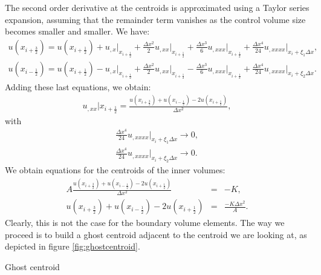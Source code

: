 \documentclass[a4paper,12pt]{article}
\makeatletter
\newenvironment{figurehere}
  {\def\@captype{figure}}
  {}
\makeatother
\begin{document}
The second order derivative at the centroids is approximated using a Taylor series expansion, assuming that the remainder term vanishes as the control volume size becomes smaller and smaller. We have:
\begin{eqnarray}
u(x_{i+\frac{3}{2}}) = u(x_{i + \frac{1}{2}}) + u_{,x}\vert_{x_{i+\frac{1}{2}}} + \frac{\Delta x^2}{2}u_{,xx}\vert_{x_{i+\frac{1}{2}}}+\frac{\Delta x^3}{6}u_{,xxx}\vert_{x_{i+\frac{1}{2}}}+\frac{\Delta x^4}{24}u_{,xxxx}\vert_{x_i+\xi_1\Delta x},\\
u(x_{i-\frac{1}{2}}) = u(x_{i + \frac{1}{2}}) - u_{,x}\vert_{x_{i+\frac{1}{2}}} + \frac{\Delta x^2}{2}u_{,xx}\vert_{x_{i+\frac{1}{2}}}-\frac{\Delta x^3}{6}u_{,xxx}\vert_{x_{i+\frac{1}{2}}}+\frac{\Delta x^4}{24}u_{,xxxx}\vert_{x_i+\xi_2\Delta x}.
\end{eqnarray}
Adding these last equations, we obtain:
\begin{eqnarray}
u_{,xx}\vert{x_{i+\frac{1}{2}}} = \frac{u(x_{i+\frac{3}{2}})+u(x_{i-\frac{1}{2}})-2u(x_{i+\frac{1}{2}})}{\Delta x^2},
\end{eqnarray}
with
\begin{eqnarray}
\frac{\Delta x^4}{24}u_{,xxxx}\vert_{x_i+\xi_1\Delta x}\rightarrow 0,\\
\frac{\Delta x^4}{24}u_{,xxxx}\vert_{x_i+\xi_2\Delta x}\rightarrow 0.
\end{eqnarray}
We obtain equations for the centroids of the inner volumes:
\begin{eqnarray}
A\frac{u(x_{i+\frac{3}{2}})+u(x_{i-\frac{1}{2}})-2u(x_{i+\frac{1}{2}})}{\Delta x^2}&=&-K,\\
u(x_{i+\frac{3}{2}})+u(x_{i-\frac{1}{2}})-2u(x_{i+\frac{1}{2}}) &=& \frac{-K\Delta x^2}{A}.
\end{eqnarray}
Clearly, this is not the case for the boundary volume elements. The way we proceed is to build a ghost centroid adjacent to the centroid we are looking at, as depicted in figure \ref{fig:ghostcentroid}.
\begin{center}
\begin{figurehere} 

\caption{Ghost centroid}\label{fig:ghostcentroid}
\end{figurehere}
\end{center}
\end{document}
